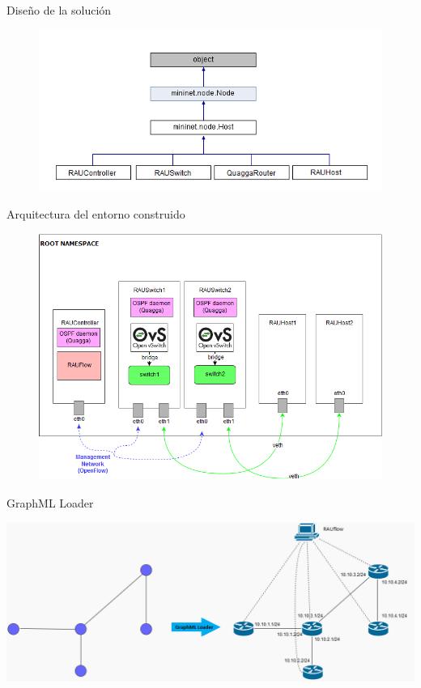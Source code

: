 \documentclass[xcolor=svgnames]{beamer}
\begin{document}
\begin{frame}{Diseño de la solución}
	\begin{figure}[t]
		\centering
		\includegraphics[scale=0.7]{clases_entorno}
	\end{figure}
\end{frame}

\begin{frame}{Arquitectura del entorno construido}
	\begin{figure}[t]
		\centering
		\includegraphics[scale=0.5]{emulator_architecture}
	\end{figure}
\end{frame}

\begin{frame}{GraphML Loader}
	\begin{center}
		\includegraphics[scale=0.4]{loader}
	\end{center}
\end{frame}
\end{document}
